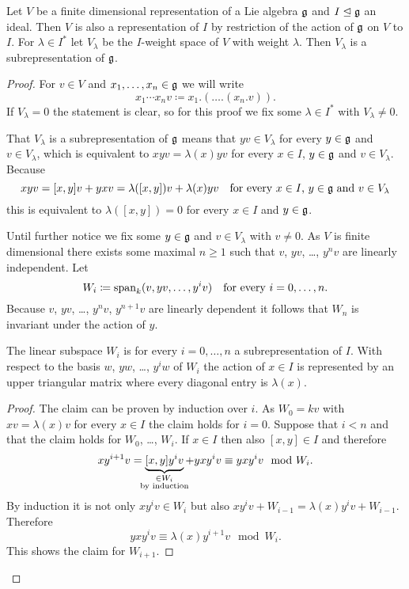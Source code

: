 \begin{lem}
 Let $V$ be a finite dimensional representation of a Lie algebra $\mathfrak{g}$ and $I \trianglelefteq \mathfrak{g}$ an ideal. Then $V$ is also a representation of $I$ by restriction of the action of $\mathfrak{g}$ on $V$ to $I$. For $\lambda \in I^*$ let $V_\lambda$ be the $I$-weight space of $V$ with weight $\lambda$. Then $V_\lambda$ is a subrepresentation of $\mathfrak{g}$.
\end{lem}
\begin{proof}
 For $v \in V$ and $x_1, \dotsc, x_n \in \mathfrak{g}$ we will write
 \[
  x_1 \dotsm x_n v \coloneqq x_1.(\dotsc.(x_n.v)).
 \]
 If $V_\lambda = 0$ the statement is clear, so for this proof we fix some $\lambda \in I^*$ with $V_\lambda \neq 0$.
 
 That $V_\lambda$ is a subrepresentation of $\mathfrak{g}$ means that $yv \in V_\lambda$ for every $y \in \mathfrak{g}$ and $v \in V_\lambda$, which is equivalent to $xyv = \lambda(x)yv$ for every $x \in I$, $y \in \mathfrak{g}$ and $v \in V_\lambda$. Because
 \[
  xyv = [x,y]v + yxv = \lambda([x,y])v + \lambda(x)yv \quad \text{for every $x \in I$, $y \in \mathfrak{g}$ and $v \in V_\lambda$}
 \]
 this is equivalent to $\lambda([x,y]) = 0$ for every $x \in I$ and $y \in \mathfrak{g}$.
 
 Until further notice we fix some $y \in \mathfrak{g}$ and $v \in V_\lambda$ with $v \neq 0$. As $V$ is finite dimensional there exists some maximal $n \geq 1$ such that $v$, $yv$, \dots, $y^n v$ are linearly independent. Let
 \[
  W_i \coloneqq \operatorname{span}_k(v, yv, \dotsc, y^i v) \quad \text{for every $i = 0, \dotsc, n$}.
 \]
 Because $v$, $yv$, \dots, $y^n v$, $y^{n+1} v$ are linearly dependent it follows that $W_n$ is invariant under the action of $y$.
 
 \begin{claim*}
  The linear subspace $W_i$ is for every $i = 0, \dotsc, n$ a subrepresentation of $I$. With respect to the basis $w$, $yw$, \dots, $y^i w$ of $W_i$ the action of $x \in I$ is represented by an upper triangular matrix where every diagonal entry is $\lambda(x)$.
 \end{claim*}
 \begin{proof}
  The claim can be proven by induction over $i$. As $W_0 = kv$ with $xv = \lambda(x)v$ for every $x \in I$ the claim holds for $i = 0$. Suppose that $i < n$ and that the claim holds for $W_0$, \dots, $W_i$. If $x \in I$ then also $[x,y] \in I$ and therefore
  \[
   x y^{i+1} v
   = \underbrace{[x,y] y^i v}_{\mathclap{\substack{\in W_i \\ \text{by induction}}}} + y x y^i v
   \equiv y x y^i v
   \mod W_i.
  \]
  By induction it is not only $x y^i v \in W_i$ but also $x y^i v + W_{i-1} = \lambda(x) y^i v + W_{i-1}$. Therefore
  \[
   y x y^i v \equiv \lambda(x) y^{i+1} v \mod W_i.
  \]
  This shows the claim for $W_{i+1}$.
 \end{proof}
 

\end{proof}

